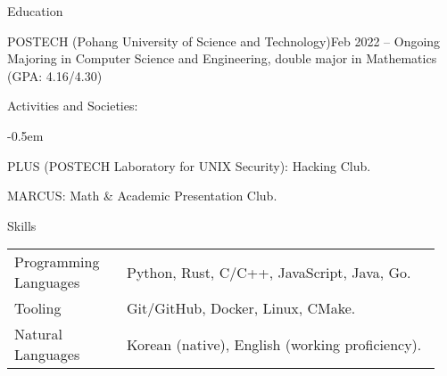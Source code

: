 \documentclass{resume}
\begin{document}
\begin{res-section}{Education}
  \begin{res-subsection}{POSTECH (Pohang University of Science and Technology)}{Feb 2022 -- Ongoing}
    Majoring in Computer Science and Engineering, double major in Mathematics (GPA: 4.16/4.30)

    \item Activities and Societies:
    \vspace{-0.5em}
    \begin{list}{--}{}
      \itemsep -0.5em
      \item PLUS (POSTECH Laboratory for UNIX Security): Hacking Club.
      \item MARCUS: Math \& Academic Presentation Club.
    \end{list}
  \end{res-subsection}
\end{res-section}

\begin{res-section}{Skills}
  \begin{tabular}{p{0.25\linewidth}p{0.7\linewidth}}
    Programming Languages
      & Python, Rust, C/C++, JavaScript, Java, Go. \\
    Tooling
      & Git/GitHub, Docker, Linux, CMake. \\
    Natural Languages
      & Korean (native), English (working proficiency).
  \end{tabular}
\end{res-section}
\end{document}
